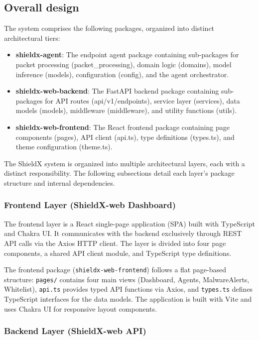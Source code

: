 \documentclass[../Main.tex]{subfiles}
\begin{document}
\subsection{Overall design}
\label{section:4.1.2}

The system comprises the following packages, organized into distinct architectural tiers:

\begin{itemize}
    \item \textbf{shieldx-agent}: The endpoint agent package containing sub-packages for packet processing (packet\_processing), domain logic (domains), model inference (models), configuration (config), and the agent orchestrator.
    \item \textbf{shieldx-web-backend}: The FastAPI backend package containing sub-packages for API routes (api/v1/endpoints), service layer (services), data models (models), middleware (middleware), and utility functions (utils).
    \item \textbf{shieldx-web-frontend}: The React frontend package containing page components (pages), API client (api.ts), type definitions (types.ts), and theme configuration (theme.ts).
\end{itemize}

The ShieldX system is organized into multiple architectural layers, each with a distinct responsibility. The following subsections detail each layer's package structure and internal dependencies.

\subsubsection{Frontend Layer (ShieldX-web Dashboard)}

The frontend layer is a React single-page application (SPA) built with TypeScript and Chakra UI. It communicates with the backend exclusively through REST API calls via the Axios HTTP client. The layer is divided into four page components, a shared API client module, and TypeScript type definitions.

The frontend package (\texttt{shieldx-web-frontend}) follows a flat page-based structure: \texttt{pages/} contains four main views (Dashboard, Agents, MalwareAlerts, Whitelist), \texttt{api.ts} provides typed API functions via Axios, and \texttt{types.ts} defines TypeScript interfaces for the data models. The application is built with Vite and uses Chakra UI for responsive layout components.

\subsubsection{Backend Layer (ShieldX-web API)}
\end{document}
